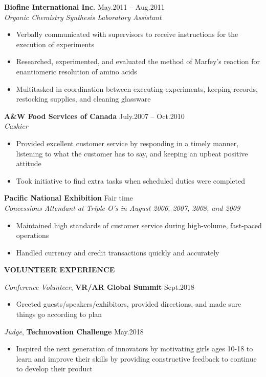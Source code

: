 \documentclass{res}
\renewcommand{\section}[1]{%
  \vspace{0.3in}%
  \centerline{\uppercase{\bf{#1}}}%
  \vspace{-6pt}}
\newcommand{\linehead}[2]{%
  {\bf #1} \hfill #2\\}
\newcommand{\linetitle}[1]{%
  {\sl #1}}
\newcommand{\linevolunteer}[3]{%
  {\sl #3}, {\bf #2} \hfill #1}%
\begin{document}
\begin{resume}
\linehead{Biofine International Inc.}{May.2011 -- Aug.2011}
\linetitle{Organic Chemistry Synthesis Laboratory Assistant}
\begin{itemize}
  \item Verbally communicated with supervisors to receive instructions for the execution of experiments
  \item Researched, experimented, and evaluated the method of Marfey's reaction for enantiomeric resolution of amino acids
  \item Multitasked in coordination between executing experiments, keeping records, restocking supplies, and cleaning glassware
\end{itemize}

\linehead{A\&W Food Services of Canada}{July.2007 -- Oct.2010}
\linetitle{Cashier}
\begin{itemize}
  \item Provided excellent customer service by responding in a timely manner, listening to what the customer has to say, and keeping an upbeat positive attitude
  \item Took initiative to find extra tasks when scheduled duties were completed
\end{itemize}

\linehead{Pacific National Exhibition}{Fair time}
\linetitle{Concessions Attendant at Triple-O's in August 2006, 2007, 2008, and 2009}
\begin{itemize}
  \item Maintained high standards of customer service during high-volume, fast-paced operations
  \item Handled currency and credit transactions quickly and accurately
\end{itemize}

\section{Volunteer experience}

\linevolunteer{Sept.2018}{%
  VR/AR Global Summit}{%
  Conference Volunteer}
\begin{itemize}
  \item Greeted guests/speakers/exhibitors, provided directions, and made sure things go according to plan
\end{itemize}

\linevolunteer{May.2018}{%
  Technovation Challenge}{%
  Judge}
\begin{itemize}
  \item Inspired the next generation of innovators by motivating girls ages 10-18 to learn and improve their skills by providing constructive feedback to continue to develop their product
\end{itemize}


\end{resume}
\end{document}
